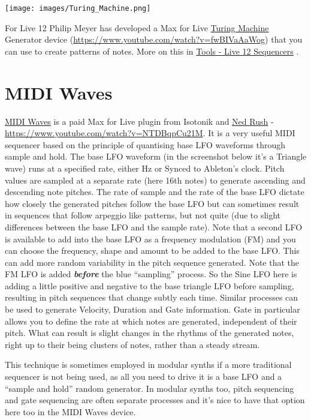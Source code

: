 \documentclass[
  12pt,
  letterpaper,
  oneside,
  open=any]{scrbook}
\begin{document}
\texttt{[image: images/Turing\_Machine.png]}

For Live 12 Philip Meyer has developed a Max for Live
\href{https://isotonikstudios.com/product/turing-machine/?srsltid=AfmBOor_T0esjLa-jI_hMBqYTUuz_1TAYSXRbD5u_57BQk_dJ-Yr4ZTt}{Turing
Machine} Generator device
(\url{https://www.youtube.com/watch?v=fwBIVaAaWog}) that you can use to
create patterns of notes. More on this in
\hyperref[Chapter-031-Tools-Live12_Sequencers]{Tools - Live 12
Sequencers} .

\section{MIDI Waves}\label{midi-waves}

\href{https://isotonikstudios.com/product/midi-waves-by-ned-rush/}{MIDI
Waves} is a paid Max for Live plugin from Isotonik and
\href{https://www.youtube.com/@NedRush}{Ned Rush} -
\url{https://www.youtube.com/watch?v=NTDBqpCu21M}. It is a very useful
MIDI sequencer based on the principle of quantising base LFO waveforms
through sample and hold. The base LFO waveform (in the screenshot below
it's a Triangle wave) runs at a specified rate, either Hz or Synced to
Ableton's clock. Pitch values are sampled at a separate rate (here 16th
notes) to generate ascending and descending note pitches. The rate of
sample and the rate of the base LFO dictate how closely the generated
pitches follow the base LFO but can sometimes result in sequences that
follow arpeggio like patterns, but not quite (due to slight differences
between the base LFO and the sample rate). Note that a second LFO is
available to add into the base LFO as a frequency modulation (FM) and
you can choose the frequency, shape and amount to be added to the base
LFO. This can add more random variability in the pitch sequence
generated. Note that the FM LFO is added \textbf{\emph{before}} the blue
``sampling'' process. So the Sine LFO here is adding a little positive
and negative to the base triangle LFO before sampling, resulting in
pitch sequences that change subtly each time. Similar processes can be
used to generate Velocity, Duration and Gate information. Gate in
particular allows you to define the rate at which notes are generated,
independent of their pitch. What can result is slight changes in the
rhythms of the generated notes, right up to their being clusters of
notes, rather than a steady stream.

This technique is sometimes employed in modular synths if a more
traditional sequencer is not being used, as all you need to drive it is
a base LFO and a ``sample and hold'' random generator. In modular synths
too, pitch sequencing and gate sequencing are often separate processes
and it's nice to have that option here too in the MIDI Waves device.
\end{document}
